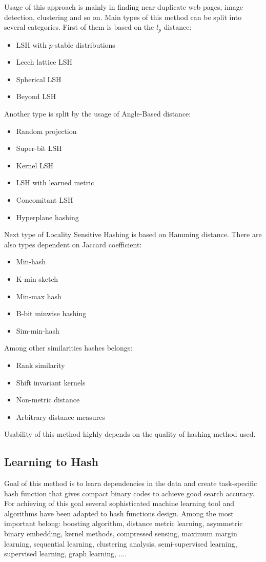 Usage of this approach is mainly in finding near-duplicate web pages, image detection, clustering and so on. 
Main types of this method can be split into several categories.
First of them is based on the $l_p$ distance:
\begin{itemize}
\item LSH with $p$-stable distributions
\item Leech lattice LSH
\item Spherical LSH
\item Beyond LSH
\end{itemize}
Another type is split by the usage of Angle-Based distance:
\begin{itemize}
\item Random projection
\item Super-bit LSH
\item Kernel LSH
\item LSH with learned metric
\item Concomitant LSH
\item Hyperplane hashing
\end{itemize}
Next type of Locality Sensitive Hashing is based on Hamming distance. There are also types dependent on Jaccard coefficient:
\begin{itemize}
\item Min-hash
\item K-min sketch
\item Min-max hash
\item B-bit minwise hashing
\item Sim-min-hash
\end{itemize}
Among other similarities hashes belongs:
\begin{itemize}
\item Rank similarity
\item Shift invariant kernels
\item Non-metric distance
\item Arbitrary distance measures
\end{itemize}
Usability of this method highly depends on the quality of hashing method used.
\subsection{Learning to Hash}
Goal of this method is to learn dependencies in the data and create task-specific hash function that gives compact binary codes to achieve good search accuracy. \cite{learnHash} For achieving of this goal several sophisticated machine learning tool and algorithms have been adapted to hash functions design. Among the most important belong: boosting algorithm, distance metric learning, asymmetric binary embedding, kernel methods, compressed sensing, maximum margin learning, sequential learning, clustering analysis, semi-supervised learning, supervised learning, graph learning, ....

